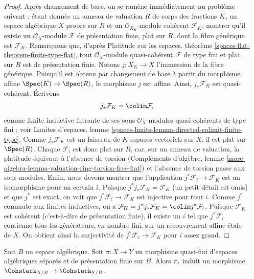 \begin{proof}
Après changement de base, on se ramène immédiatement au problème suivant :
étant donnés un anneau de valuation $R$ de corps des fractions $K$, un espace
algébrique $X$ propre sur $R$ et un $\mathcal{O}_{X_K}$-module cohérent
$\mathcal{F}_K$, montrer qu'il existe un $\mathcal{O}_X$-module
$\mathcal{F}$ de présentation finie, plat sur $R$, dont la fibre générique
est $\mathcal{F}_K$.
Remarquons que, d'après Platitude sur les espaces, théorème
\ref{spaces-flat-theorem-finite-type-flat}, tout $\mathcal{O}_X$-module
quasi-cohérent $\mathcal{F}$ de type fini et plat sur $R$ est de
présentation finie.
Notons $j : X_K \to X$ l'immersion de la fibre générique.
Puisqu'il est obtenu par changement de base à partir du morphisme affine
$\Spec(K) \to \Spec(R)$, le morphisme $j$ est affine. Ainsi,
$j_*\mathcal{F}_K$ est quasi-cohérent. Écrivons
$$
j_*\mathcal{F}_K = \colim \mathcal{F}_i
$$
comme limite inductive filtrante de ses sous-$\mathcal{O}_X$-modules
quasi-cohérents de type fini ; voir Limites d'espaces, lemme
\ref{spaces-limits-lemma-directed-colimit-finite-type}.
Comme $j_*\mathcal{F}_K$ est un faisceau de $K$-espaces vectoriels sur
$X$, il est plat sur $\Spec(R)$. Chaque $\mathcal{F}_i$ est donc plat sur
$R$, car, sur un anneau de valuation, la platitude équivaut à l'absence de
torsion (Compléments d'algèbre, lemme
\ref{more-algebra-lemma-valuation-ring-torsion-free-flat}) et l'absence de
torsion passe aux sous-modules.
Enfin, nous devons montrer que l'application
$j^*\mathcal{F}_i \to \mathcal{F}_K$
est un isomorphisme pour un certain $i$.
Puisque $j^*j_*\mathcal{F}_K = \mathcal{F}_K$ (un petit détail est omis)
et que $j^*$ est exact, on voit que
$j^*\mathcal{F}_i \to \mathcal{F}_K$ est injective pour tout $i$.
Comme $j^*$ commute aux limites inductives, on a
$\mathcal{F}_K = j^*j_*\mathcal{F}_K = \colim j^*\mathcal{F}_i$.
Puisque $\mathcal{F}_K$ est cohérent (c'est-à-dire de présentation finie),
il existe un $i$ tel que $j^*\mathcal{F}_i$ contienne tous les générateurs,
en nombre fini, sur un recouvrement affine \'etale de $X$.
On obtient ainsi la surjectivité de
$j^*\mathcal{F}_i \to \mathcal{F}_K$ pour $i$ assez grand.
\end{proof}

\begin{lemma}
\label{lemma-coherent-functorial}
Soit $B$ un espace algébrique. Soit $\pi : X \to Y$ un morphisme
quasi-fini d'espaces algébriques séparés et de présentation finie sur $B$.
Alors $\pi_*$ induit un morphisme
$\Cohstack_{X/B} \to \Cohstack_{Y/B}$.
\end{lemma}

